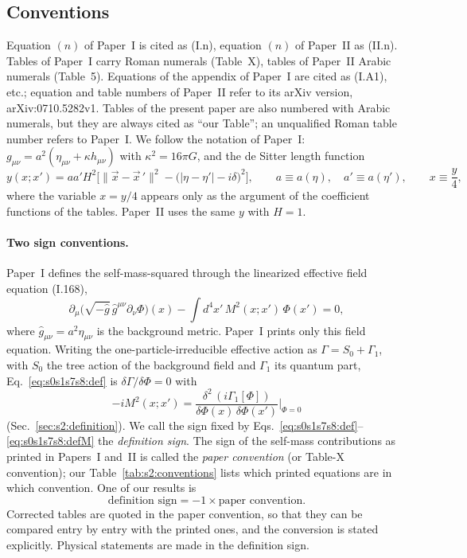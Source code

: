 \documentclass[aps,prd,onecolumn,10pt,nofootinbib,floatfix]{revtex4-2}
\newcommand{\eqI}[1]{(I.#1)}
\newcommand{\eqII}[1]{(II.#1)}
\begin{document}
\subsection{Conventions}
\label{sec:s0s1s7s8:conventions}

Equation $(n)$ of Paper~I is cited as \eqI{n}, equation $(n)$ of Paper~II as \eqII{n}. Tables of Paper~I carry Roman numerals
(Table~X), tables of Paper~II Arabic numerals (Table~5). Equations of the appendix of Paper~I are cited as \eqI{A1}, etc.; equation
and table numbers of Paper~II refer to its arXiv version, arXiv:0710.5282v1. Tables of the present paper are also numbered with Arabic numerals,
but they are always cited as ``our Table''; an unqualified Roman table number refers to Paper~I\@. We follow the notation of Paper~I: $g_{\mu\nu}=a^2(\eta_{\mu\nu}+\kappa
h_{\mu\nu})$ with $\kappa^2=16\pi G$, and the de Sitter length function
\begin{equation}
y(x;x')=aa'H^2\Big[\|\vec x-\vec x\,'\|^2-\big(|\eta-\eta'|-i\delta\big)^2\Big],\qquad a\equiv a(\eta),\quad a'\equiv a(\eta'),\qquad
x\equiv\frac y4 ,
\label{eq:s0s1s7s8:y}
\end{equation}
where the variable $x=y/4$ appears only as the argument of the coefficient functions of the tables. Paper~II uses the same $y$ with
$H=1$.

\paragraph*{Two sign conventions.}
Paper~I defines the self-mass-squared through the linearized effective field equation \eqI{168},
\begin{equation}
\partial_\mu\big(\sqrt{-\hat g}\,\hat g^{\mu\nu}\partial_\nu\Phi\big)(x)-\int d^4x'\,M^2(x;x')\,\Phi(x')=0,
\label{eq:s0s1s7s8:def}
\end{equation}
where $\hat g_{\mu\nu}=a^2\eta_{\mu\nu}$ is the background metric. Paper~I prints only this field equation. Writing the
one-particle-irreducible effective action as $\Gamma=S_0+\Gamma_1$, with $S_0$ the tree action of the background field and $\Gamma_1$ its
quantum part, Eq.~\eqref{eq:s0s1s7s8:def} is $\delta\Gamma/\delta\Phi=0$ with
\begin{equation}
-iM^2(x;x')=\frac{\delta^2\,(i\Gamma_1[\Phi])}{\delta\Phi(x)\,\delta\Phi(x')}\Big|_{\Phi=0}
\label{eq:s0s1s7s8:defM}
\end{equation}
(Sec.~\ref{sec:s2:definition}). We call the sign fixed by Eqs.~\eqref{eq:s0s1s7s8:def}--\eqref{eq:s0s1s7s8:defM} the
\emph{definition sign}. The sign of the self-mass
contributions as printed in Papers~I and~II is called the \emph{paper convention} (or Table-X convention); our
Table~\ref{tab:s2:conventions} lists which printed equations are in which convention. One of our results is
\begin{equation}
\text{definition sign}=-1\times\text{paper convention}.
\label{eq:s0s1s7s8:signs}
\end{equation}
Corrected tables are quoted in the paper convention, so that they can be compared entry by entry with the printed ones, and the
conversion is stated explicitly. Physical statements are made in the definition sign.
\end{document}
